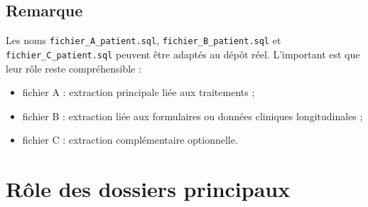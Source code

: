 \documentclass[11pt,a4paper]{article}
\newcommand{\code}[1]{\texttt{#1}}
\begin{document}
\subsection*{Remarque}

Les noms \code{fichier\_A\_patient.sql}, \code{fichier\_B\_patient.sql} et \code{fichier\_C\_patient.sql} peuvent être adaptés au dépôt réel. L'important est que leur rôle reste compréhensible :
\begin{itemize}
  \item fichier A : extraction principale liée aux traitements ;
  \item fichier B : extraction liée aux formulaires ou données cliniques longitudinales ;
  \item fichier C : extraction complémentaire optionnelle.
\end{itemize}

\section{Rôle des dossiers principaux}
\end{document}
